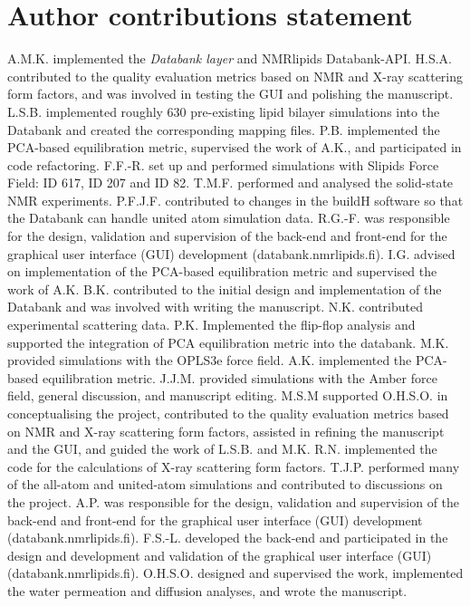 \documentclass[fleqn,10pt]{wlscirep}
\begin{document}
\section*{Author contributions statement}

A.M.K. implemented the {\it Databank layer} and NMRlipids Databank-API.
H.S.A. contributed to the quality evaluation metrics based on NMR and X-ray scattering form factors, and was involved in testing the GUI and polishing the manuscript.
L.S.B. implemented roughly 630 pre-existing lipid bilayer simulations into the Databank and created the corresponding mapping files.
P.B. implemented the PCA-based equilibration metric, supervised the work of A.K., and participated in code refactoring.
F.F.-R. set up and performed simulations with Slipids Force Field: ID 617, ID 207 and ID 82. 
T.M.F. performed and analysed the solid-state NMR experiments.
P.F.J.F. contributed to changes in the buildH software so that the Databank can handle united atom simulation data.
R.G.-F. was responsible for the design, validation and supervision of the back-end and front-end for the graphical user interface (GUI) development (databank.nmrlipids.fi).
I.G. advised on implementation of the PCA-based equilibration metric and supervised the work of A.K.
B.K. contributed to the initial design and implementation of the Databank and was involved with writing the manuscript.
N.K. contributed experimental scattering data. %
P.K. Implemented the flip-flop analysis and supported the integration of PCA equilibration metric into the databank.
M.K. provided simulations with the OPLS3e force field. 
A.K. implemented the PCA-based equilibration metric.
J.J.M. provided simulations with the Amber force field, general discussion, and manuscript editing.
M.S.M supported O.H.S.O. in conceptualising the project, contributed to the quality evaluation metrics based on NMR and X-ray scattering form factors, assisted in refining the manuscript and the GUI, and guided the work of L.S.B. and M.K.
R.N. implemented the code for the calculations of X-ray scattering form factors.
T.J.P. performed many of the all-atom and united-atom simulations and contributed to discussions on the project.
A.P. was responsible for the design, validation and supervision of the back-end and front-end for the graphical user interface (GUI) development (databank.nmrlipids.fi).
F.S.-L. developed the back-end and participated in the design and development and validation of the graphical user interface (GUI) (databank.nmrlipids.fi).
O.H.S.O. designed and supervised the work, implemented the water permeation and diffusion analyses, and wrote the manuscript. 
 
\end{document}
